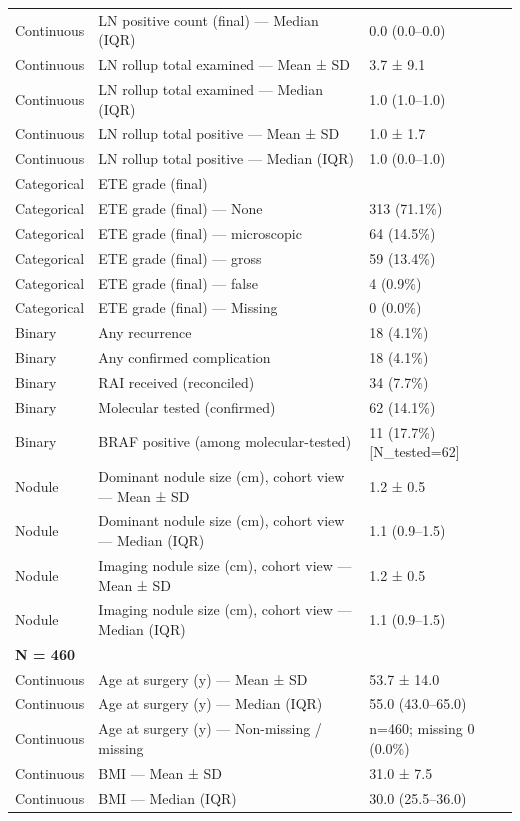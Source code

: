 \begin{table}[htbp]
\begin{tabular}{lll}
Continuous & LN positive count (final) — Median (IQR) & 0.0 (0.0–0.0) \\
Continuous & LN rollup total examined — Mean ± SD & 3.7 ± 9.1 \\
Continuous & LN rollup total examined — Median (IQR) & 1.0 (1.0–1.0) \\
Continuous & LN rollup total positive — Mean ± SD & 1.0 ± 1.7 \\
Continuous & LN rollup total positive — Median (IQR) & 1.0 (0.0–1.0) \\
Categorical & ETE grade (final) &  \\
Categorical & ETE grade (final) — None & 313 (71.1\%) \\
Categorical & ETE grade (final) — microscopic & 64 (14.5\%) \\
Categorical & ETE grade (final) — gross & 59 (13.4\%) \\
Categorical & ETE grade (final) — false & 4 (0.9\%) \\
Categorical & ETE grade (final) — Missing & 0 (0.0\%) \\
Binary & Any recurrence & 18 (4.1\%) \\
Binary & Any confirmed complication & 18 (4.1\%) \\
Binary & RAI received (reconciled) & 34 (7.7\%) \\
Binary & Molecular tested (confirmed) & 62 (14.1\%) \\
Binary & BRAF positive (among molecular-tested) & 11 (17.7\%) [N\_tested=62] \\
Nodule & Dominant nodule size (cm), cohort view — Mean ± SD & 1.2 ± 0.5 \\
Nodule & Dominant nodule size (cm), cohort view — Median (IQR) & 1.1 (0.9–1.5) \\
Nodule & Imaging nodule size (cm), cohort view — Mean ± SD & 1.2 ± 0.5 \\
Nodule & Imaging nodule size (cm), cohort view — Median (IQR) & 1.1 (0.9–1.5) \\
\multicolumn{3}{l}{\textbf{N = 460}} \\
Continuous & Age at surgery (y) — Mean ± SD & 53.7 ± 14.0 \\
Continuous & Age at surgery (y) — Median (IQR) & 55.0 (43.0–65.0) \\
Continuous & Age at surgery (y) — Non-missing / missing & n=460; missing 0 (0.0\%) \\
Continuous & BMI — Mean ± SD & 31.0 ± 7.5 \\
Continuous & BMI — Median (IQR) & 30.0 (25.5–36.0) \\

\end{tabular}
\end{table}

